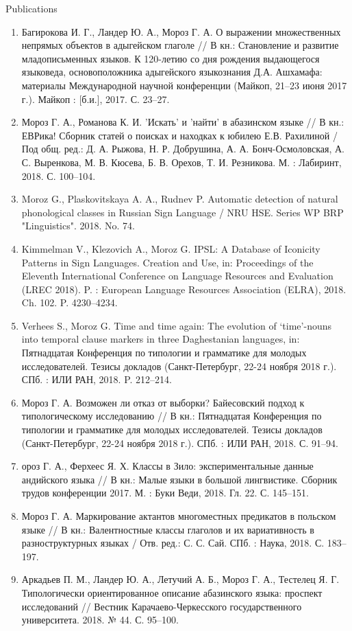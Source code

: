 \documentclass{resume} %
\begin{document}
\begin{rSection}{Publications}
\begin{enumerate}
\item Багирокова И. Г., Ландер Ю. А., Мороз Г. А. О выражении множественных непрямых объектов в адыгейском глаголе // В кн.: Становление и развитие младописьменных языков. К 120-летию со дня рождения выдающегося языковеда, основоположника адыгейского языкознания Д.А. Ашхамафа: материалы Международной научной конференции (Майкоп, 21--23 июня 2017 г.). Майкоп : [б.и.], 2017. С. 23--27.
\item  Мороз Г. А., Романова К. И. 'Искать' и 'найти' в абазинском языке // В кн.: ЕВРика! Сборник статей о поисках и находках к юбилею Е.В. Рахилиной / Под общ. ред.: Д. А. Рыжова, Н. Р. Добрушина, А. А. Бонч-Осмоловская, А. С. Выренкова, М. В. Кюсева, Б. В. Орехов, Т. И. Резникова. М. : Лабиринт, 2018. С. 100--104.
\item Moroz G., Plaskovitskaya A. A., Rudnev P. Automatic detection of natural phonological classes in Russian Sign Language / NRU HSE. Series WP BRP "Linguistics". 2018. No. 74.
\item Kimmelman V., Klezovich A., Moroz G. IPSL: A Database of Iconicity Patterns in Sign Languages. Creation and Use, in: Proceedings of the Eleventh International Conference on Language Resources and Evaluation (LREC 2018). P. : European Language Resources Association (ELRA), 2018. Ch. 102. P. 4230--4234.
\item Verhees S., Moroz G. Time and time again: The evolution of ‘time’-nouns into temporal clause markers in three Daghestanian languages, in: Пятнадцатая Конференция по типологии и грамматике для молодых исследователей. Тезисы докладов (Санкт-Петербург, 22-24 ноября 2018 г.). СПб. : ИЛИ РАН, 2018. P. 212--214.
\item Мороз Г. А. Возможен ли отказ от выборки? Байесовский подход к типологическому исследованию // В кн.: Пятнадцатая Конференция по типологии и грамматике для молодых исследователей. Тезисы докладов (Санкт-Петербург, 22-24 ноября 2018 г.). СПб. : ИЛИ РАН, 2018. С. 91--94.
\item ороз Г. А., Ферхеес Я. Х. Классы в Зило: экспериментальные данные андийского языка // В кн.: Малые языки в большой лингвистике. Сборник трудов конференции 2017. М. : Буки Веди, 2018. Гл. 22. С. 145--151.
\item Мороз Г. А. Маркирование актантов многоместных предикатов в польском языке // В кн.: Валентностные классы глаголов и их вариативность в разноструктурных языках / Отв. ред.: С. С. Сай. СПб. : Наука, 2018. С. 183--197.
\item Аркадьев П. М., Ландер Ю. А., Летучий А. Б., Мороз Г. А., Тестелец Я. Г. Типологически ориентированное описание абазинского языка: проспект исследований // Вестник Карачаево-Черкесского государственного университета. 2018. № 44. С. 95--100.

\end{enumerate}
\end{rSection}
\end{document}
